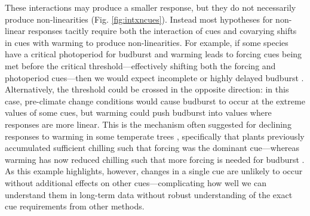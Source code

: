 \documentclass[11pt,letter]{article}
\begin{document}
These interactions may produce a smaller response, but they do not necessarily produce non-linearities (Fig. \ref{fig:intxncues}). Instead most hypotheses for non-linear responses tacitly require both the interaction of cues and covarying shifts in cues with warming to produce non-linearities. For example, if some species have a critical photoperiod for budburst and warming leads to forcing cues being met before the critical threshold---effectively shifting both the forcing and photoperiod cues---then we would expect incomplete or highly delayed budburst \citep{Singh:2017,rinne2018}. Alternatively, the threshold could be crossed in the opposite direction: in this case, pre-climate change conditions would cause budburst to occur at the extreme values of some cues, but warming could push budburst into values where responses are more linear.  This is the mechanism often suggested for declining responses to warming in some temperate trees \citep{fu2015,piao2017,gauzere2019}, specifically that plants previously accumulated sufficient chilling such that forcing was the dominant cue---whereas warming has now reduced chilling such that more forcing is needed for budburst \citep[producing an overall muted effect when estimated as change in days per $\degree$C, see][for one example]{fu2015}. As this example highlights, however, changes in a single cue are unlikely to occur without additional effects on other cues---complicating how well we can understand them in long-term data without robust understanding of the exact cue requirements from other methods.


\end{document}
